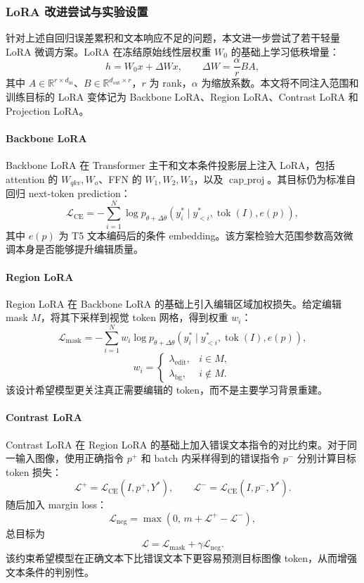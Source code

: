 \subsubsection{LoRA 改进尝试与实验设置}

针对上述自回归误差累积和文本响应不足的问题，本文进一步尝试了若干轻量 LoRA 微调方案。LoRA 在冻结原始线性层权重 \(W_0\) 的基础上学习低秩增量：
\[
h = W_0x + \Delta W x,\qquad
\Delta W = \frac{\alpha}{r}BA,
\]
其中 \(A\in\mathbb{R}^{r\times d_{\mathrm{in}}}\)、\(B\in\mathbb{R}^{d_{\mathrm{out}}\times r}\)，\(r\) 为 rank，\(\alpha\) 为缩放系数。本文将不同注入范围和训练目标的 LoRA 变体记为 Backbone LoRA、Region LoRA、Contrast LoRA 和 Projection LoRA。

\paragraph{Backbone LoRA}
Backbone LoRA 在 Transformer 主干和文本条件投影层上注入 LoRA，包括 attention 的 \(W_{qkv},W_o\)、FFN 的 \(W_1,W_2,W_3\)，以及 \(\operatorname{cap\_proj}\)。其目标仍为标准自回归 next-token prediction：
\[
\mathcal{L}_{\mathrm{CE}}
=-\sum_{i=1}^{N}\log p_{\theta+\Delta\theta}
(y_i^\ast\mid y_{<i}^\ast,\operatorname{tok}(I),e(p)),
\]
其中 \(e(p)\) 为 T5 文本编码后的条件 embedding。该方案检验大范围参数高效微调本身是否能够提升编辑质量。

\paragraph{Region LoRA}
Region LoRA 在 Backbone LoRA 的基础上引入编辑区域加权损失。给定编辑 mask \(M\)，将其下采样到视觉 token 网格，得到权重 \(w_i\)：
\[
\mathcal{L}_{\mathrm{mask}}
=-\sum_{i=1}^{N}w_i
\log p_{\theta+\Delta\theta}
(y_i^\ast\mid y_{<i}^\ast,\operatorname{tok}(I),e(p)),
\]
\[
w_i=
\begin{cases}
\lambda_{\mathrm{edit}}, & i\in M,\\
\lambda_{\mathrm{bg}}, & i\notin M.
\end{cases}
\]
该设计希望模型更关注真正需要编辑的 token，而不是主要学习背景重建。

\paragraph{Contrast LoRA}
Contrast LoRA 在 Region LoRA 的基础上加入错误文本指令的对比约束。对于同一输入图像，使用正确指令 \(p^+\) 和 batch 内采样得到的错误指令 \(p^-\) 分别计算目标 token 损失：
\[
\mathcal{L}^{+}=\mathcal{L}_{\mathrm{CE}}(I,p^+,Y^\ast),\qquad
\mathcal{L}^{-}=\mathcal{L}_{\mathrm{CE}}(I,p^-,Y^\ast).
\]
随后加入 margin loss：
\[
\mathcal{L}_{\mathrm{neg}}
=\max(0,\,m+\mathcal{L}^{+}-\mathcal{L}^{-}),
\]
总目标为
\[
\mathcal{L}
=\mathcal{L}_{\mathrm{mask}}+\gamma\mathcal{L}_{\mathrm{neg}}.
\]
该约束希望模型在正确文本下比错误文本下更容易预测目标图像 token，从而增强文本条件的判别性。

